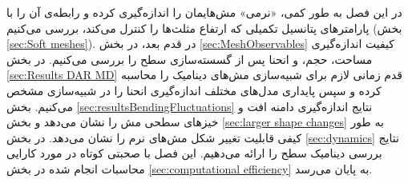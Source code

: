 در این فصل به طور کمی، «نرمی‌» مش‌هایمان را اندازه‌گیری کرده و رابطه‌ی آن را با پارامتر‌های پتانسیل‌ تکمیلی که ارتفاع مثلث‌ها را کنترل می‌کند، بررسی می‌کنیم (بخش
\ref{sec:Soft meshes}).
 در قدم بعد، در بخش 
\ref{sec:MeshObservables}
کیفیت اندازه‌گیری مساحت، حجم، و انحنا پس از گسسته‌سازی سطح را بررسی می‌کنیم. در بخش
\ref{sec:Results DAR MD}
قدم زمانی لازم برای شبیه‌سازی مش‌های دینامیک را محاسبه کرده و سپس پایداری مدل‌های مختلف اندازه‌گیری انحنا را در شبیه‌سازی مشخص می‌کنیم. بخش 
\ref{sec:resultsBendingFluctuations}  
نتایج اندازه‌گیری دامنه افت و خیزهای سطحی مش را نشان می‌دهد و بخش 
\ref{sec:larger shape changes}
به طور کیفی قابلیت تغییر شکل مش‌های نرم را نشان می‌دهد. در بخش
\ref{sec:dynamics}
نتایج بررسی دینامیک سطح را ارائه می‌دهیم. این فصل با صحبتی کوتاه در مورد کارایی محاسبات انجام شده در بخش
\ref{sec:computational efficiency}
به پایان می‌رسد.